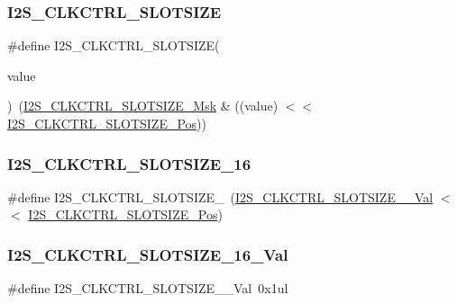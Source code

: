 \subsubsection{\texorpdfstring{I2S\_CLKCTRL\_SLOTSIZE}{I2S\_CLKCTRL\_SLOTSIZE}}
{\footnotesize\ttfamily \#define I2\+S\+\_\+\+C\+L\+K\+C\+T\+R\+L\+\_\+\+S\+L\+O\+T\+S\+I\+ZE(\begin{DoxyParamCaption}\item[{}]{value }\end{DoxyParamCaption})~(\mbox{\hyperlink{group___s_a_m_d21___i2_s_ga44dd337625fc79571870ef2128a2511d}{I2\+S\+\_\+\+C\+L\+K\+C\+T\+R\+L\+\_\+\+S\+L\+O\+T\+S\+I\+Z\+E\+\_\+\+Msk}} \& ((value) $<$$<$ \mbox{\hyperlink{group___s_a_m_d21___i2_s_ga3790543c148a2adda023e411fd6595ad}{I2\+S\+\_\+\+C\+L\+K\+C\+T\+R\+L\+\_\+\+S\+L\+O\+T\+S\+I\+Z\+E\+\_\+\+Pos}}))}

\mbox{\label{group___s_a_m_d21___i2_s_gabb0f421f0ccb2663d741941a78266807}} 
\subsubsection{\texorpdfstring{I2S\_CLKCTRL\_SLOTSIZE\_16}{I2S\_CLKCTRL\_SLOTSIZE\_16}}
{\footnotesize\ttfamily \#define I2\+S\+\_\+\+C\+L\+K\+C\+T\+R\+L\+\_\+\+S\+L\+O\+T\+S\+I\+Z\+E\+\_~(\mbox{\hyperlink{group___s_a_m_d21___i2_s_ga4caa59c4008c74b3ee0a8be8dd02183b}{I2\+S\+\_\+\+C\+L\+K\+C\+T\+R\+L\+\_\+\+S\+L\+O\+T\+S\+I\+Z\+E\+\_\+\_\+\+Val}}   $<$$<$ \mbox{\hyperlink{group___s_a_m_d21___i2_s_ga3790543c148a2adda023e411fd6595ad}{I2\+S\+\_\+\+C\+L\+K\+C\+T\+R\+L\+\_\+\+S\+L\+O\+T\+S\+I\+Z\+E\+\_\+\+Pos}})}

\mbox{\label{group___s_a_m_d21___i2_s_ga4caa59c4008c74b3ee0a8be8dd02183b}} 
\subsubsection{\texorpdfstring{I2S\_CLKCTRL\_SLOTSIZE\_16\_Val}{I2S\_CLKCTRL\_SLOTSIZE\_16\_Val}}
{\footnotesize\ttfamily \#define I2\+S\+\_\+\+C\+L\+K\+C\+T\+R\+L\+\_\+\+S\+L\+O\+T\+S\+I\+Z\+E\+\_\+\_\+\+Val~0x1ul}



